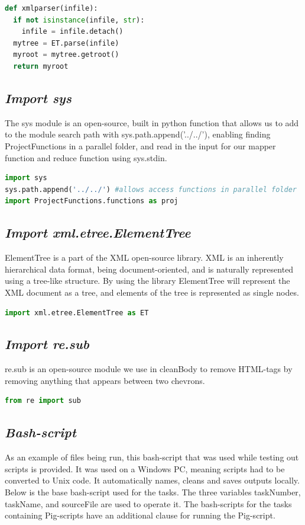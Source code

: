 \documentclass[fleqn,10pt]{wlscirep}
\begin{document}
\begin{lstlisting}[language=Python, caption=xmlparser function]
def xmlparser(infile):
  if not isinstance(infile, str):
    infile = infile.detach()
  mytree = ET.parse(infile)
  myroot = mytree.getroot()
  return myroot
\end{lstlisting}

\subsection{\emph{Import sys}}
The sys module is an open-source, built in python function that allows us to add to the module search path with sys.path.append('../../'), enabling finding ProjectFunctions in a parallel folder, and read in the input for our mapper function and reduce function using sys.stdin.
\begin{lstlisting}[language=Python, caption=Import for sys]
import sys
sys.path.append('../../') #allows access functions in parallel folder
import ProjectFunctions.functions as proj
\end{lstlisting}



\subsection{\emph{Import xml.etree.ElementTree}}
ElementTree is a part of the XML open-source library. XML is an inherently hierarchical data format, being document-oriented, and is naturally represented using a tree-like structure. By using the library ElementTree will represent the XML document as a tree, and elements of the tree is represented as single nodes. 
\begin{lstlisting}[language=Python, caption=Import for ElementTree]
import xml.etree.ElementTree as ET
\end{lstlisting}

\subsection{\emph{Import re.sub}}
re.sub is an open-source module we use in cleanBody to remove HTML-tags by removing anything that appears between two chevrons.
\begin{lstlisting}[language=Python, caption=Import for re.sub]
from re import sub
\end{lstlisting}

\subsection{\emph{Bash-script}}
As an example of files being run, this bash-script that was used while testing out scripts is provided. It was used on a Windows PC, meaning scripts had to be converted to Unix code. It automatically names, cleans and saves outputs locally. Below is the base bash-script used for the tasks. The three variables taskNumber, taskName, and sourceFile are used to operate it. The bash-scripts for the tasks containing Pig-scripts have an additional clause for running the Pig-script.

\end{document}
